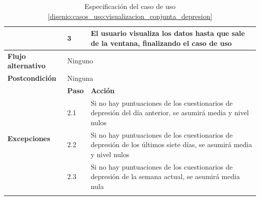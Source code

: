 \begin{table}[h]
\begin{tabularx}{\textwidth}{|l|l|X|}
                    \cline{2-3} & 3 & El usuario visualiza los datos hasta que sale de la ventana, finalizando el caso de uso \\
                    \hline
                    \textbf{Flujo alternativo} & \multicolumn{2}{|X|}{Ninguno} \\
                    \hline
                    \textbf{Postcondición} & \multicolumn{2}{|X|}{Ninguna} \\
                    \hline
                    \multirow{4}{*}{\textbf{Excepciones}}  & \textbf{Paso} & \textbf{Acción} \\
                    \cline{2-3} & 2.1 & Si no hay puntuaciones de los cuestionarios de depresión del día anterior, se asumirá media y nivel nulos \\
                    \cline{2-3} & 2.2 & Si no hay puntuaciones de los cuestionarios de depresión de los últimos siete días, se asumirá media y nivel nulos \\
                    \cline{2-3} & 2.3 & Si no hay puntuaciones de los cuestionarios de depresión de la semana actual, se asumirá media nula \\
                    \hline
                    \caption{Especificación del caso de uso \ref{disenio:casos_uso:visualizacion_conjunta_depresion}}
                    \label{tabla:casos_uso:visualizacion_conjunta_depresion}
                \end{tabularx}
            \end{table}

